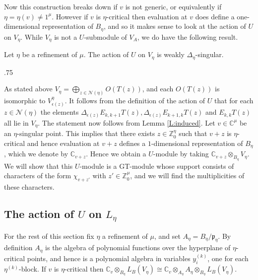 \documentclass[11pt,fleqn]{article}
\makeatletter
\newcounter{para}[section]
\renewenvironment{proof}[1][\textit{Proof}]{\par
  \pushQED{\qed}%
  \normalfont \topsep.75\paraskip\relax
  \trivlist
  \item[\hskip\labelsep
        \itshape
    #1\@addpunct{.}]\ignorespaces
}{%
  \popQED\endtrivlist\@endpefalse
}
\newcommand\CC{\mathbb C}
\newcommand\ZZ{\mathbb Z}
\newcommand\N{\mathcal N}
\newcommand\ot{\otimes}
\newcommand\p{\mathfrak p}
\makeatother
\begin{document}
Now this construction breaks down if $v$ is not generic, or equivalently if 
$\eta = \eta(v) \neq 1^\mu$. However if $v$ is $\eta$-critical then evaluation 
at $v$ does define a one-dimensional representation of $B_\eta$, and so it 
makes sense to look at the action of $U$ on $V_\eta$. While $V_\eta$ is not a 
$U$-submodule of $V_A$, we do have the following result.
\begin{Proposition}
\label{P:GT-weak-singular}
Let $\eta$ be a refinement of $\mu$. The action of $U$ on $V_\eta$ is weakly 
$\Delta_\eta$-singular.
\end{Proposition}
\begin{proof}
As stated above $V_\eta = \bigoplus_{z \in \N(\eta)} O(T(z))$, and each 
$O(T(z))$ is isomorphic to $V^\eta_{\epsilon(z)}$. It follows from the 
definition of the action of $U$ that for each $z \in \N(\eta)$ the elements
$\Delta_{\epsilon(z)} E_{k,k+1} T(z), \Delta_{\epsilon(z)} E_{k+1,k} T(z)$ and 
$E_{k,k} T(z)$ all lie in $V_\eta$. The statement now follows from Lemma 
\ref{L:induced}. 
\end{proof}
Let $v \in \CC^\mu$ be an $\eta$-singular point. This implies that there 
exists $z \in \ZZ^\eta_0$ such that $v+z$ is $\eta$-critical and hence 
evaluation at $v+z$ defines a $1$-dimensional representation of $B_\eta$, 
which we denote by $\CC_{v+z}$. Hence we obtain a $U$-module by taking 
$\CC_{v+z} \ot_{B_\eta} V_\eta$. We will show that this $U$-module is a 
GT-module whose support consists of characters of the form $\chi_{v+z'}$ with 
$z' \in \ZZ^\mu_0$, and we will find the multiplicities of these characters.


\subsection{The action of $U$ on $L_\eta$}
For the rest of this section fix $\eta$ a refinement of $\mu$, and
set $A_\eta = B_\eta / \p_\eta$. By definition $A_\eta$ is the algebra
of polynomial functions over the hyperplane of $\eta$-critical points,
and hence is a polynomial algebra in variables $y_i^{(k)}$, one for each
$\eta^{(k)}$-block. If $v$ is $\eta$-critical then $\CC_v \ot_{B_\eta} 
L_B(V_\eta) \cong \CC_v \ot_{A_\eta} A_\eta \ot_{B_\eta} L_B(V_\eta)$.
\end{document}
